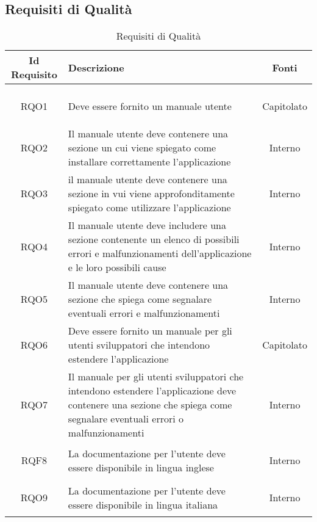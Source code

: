\subsection{Requisiti di Qualità}
\normalsize
\begin{longtable}{|c|>{\centering}m{7cm}|c|}
\hline
\textbf{Id Requisito} & \textbf{Descrizione} & \textbf{Fonti}\\
\hline
\endhead
		\\ \hline
		\hypertarget{RQO1}{RQO1} & Deve essere fornito un manuale utente & Capitolato
		\\ \hline
		\hypertarget{RQO2}{RQO2} & Il manuale utente deve contenere una sezione un cui viene spiegato come installare correttamente l'applicazione & Interno
		\\ \hline
		\hypertarget{RQO3}{RQO3} & il manuale utente deve contenere una sezione in vui viene approfonditamente spiegato come utilizzare l'applicazione & Interno
		\\ \hline
		\hypertarget{RQO4}{RQO4} & Il manuale utente deve includere una sezione contenente un elenco di possibili errori e malfunzionamenti dell'applicazione e le loro possibili cause & Interno
		\\ \hline
		\hypertarget{RQO5}{RQO5} & Il manuale utente deve contenere una sezione che spiega come segnalare eventuali errori e malfunzionamenti & Interno
		\\ \hline
		\hypertarget{RQO6}{RQO6} & Deve essere fornito un manuale per gli utenti sviluppatori che intendono estendere l'applicazione & Capitolato
		\\ \hline
		\hypertarget{RQO7}{RQO7} & Il manuale per gli utenti sviluppatori che intendono estendere l'applicazione deve contenere una sezione che spiega come segnalare eventuali errori o malfunzionamenti & Interno
		\\ \hline
		\hypertarget{RQF8}{RQF8} & La documentazione per l'utente deve essere disponibile in lingua inglese & Interno
		\\ \hline
		\hypertarget{RQO9}{RQO9} & La documentazione per l'utente deve essere disponibile in lingua italiana & Interno
\caption[Requisiti di Qualità]{Requisiti di Qualità}
\label{tabella:req2}
\end{longtable}
\clearpage
